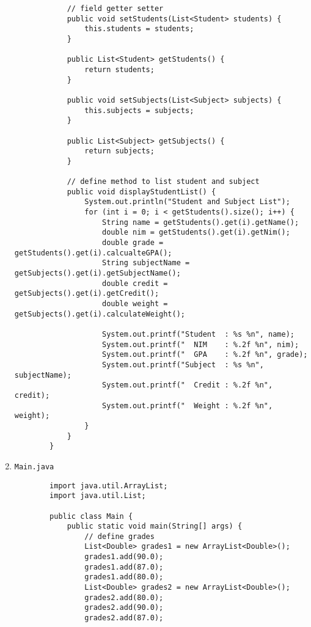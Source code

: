 \documentclass[12pt,titlepage]{article}
\begin{document}
\begin{enumerate}
\begin{verbatim}
            // field getter setter
            public void setStudents(List<Student> students) {
                this.students = students;
            }

            public List<Student> getStudents() {
                return students;
            }

            public void setSubjects(List<Subject> subjects) {
                this.subjects = subjects;
            }

            public List<Subject> getSubjects() {
                return subjects;
            }

            // define method to list student and subject
            public void displayStudentList() {
                System.out.println("Student and Subject List");
                for (int i = 0; i < getStudents().size(); i++) {
                    String name = getStudents().get(i).getName();
                    double nim = getStudents().get(i).getNim();
                    double grade = getStudents().get(i).calcualteGPA();
                    String subjectName = getSubjects().get(i).getSubjectName();
                    double credit = getSubjects().get(i).getCredit();
                    double weight = getSubjects().get(i).calculateWeight();

                    System.out.printf("Student  : %s %n", name);
                    System.out.printf("  NIM    : %.2f %n", nim);
                    System.out.printf("  GPA    : %.2f %n", grade);
                    System.out.printf("Subject  : %s %n", subjectName);
                    System.out.printf("  Credit : %.2f %n", credit);
                    System.out.printf("  Weight : %.2f %n", weight);
                }
            }
        }
    \end{verbatim}
    \item \texttt{Main.java}
    \begin{verbatim}
        import java.util.ArrayList;
        import java.util.List;

        public class Main {
            public static void main(String[] args) {
                // define grades
                List<Double> grades1 = new ArrayList<Double>();
                grades1.add(90.0);
                grades1.add(87.0);
                grades1.add(80.0);
                List<Double> grades2 = new ArrayList<Double>();
                grades2.add(80.0);
                grades2.add(90.0);
                grades2.add(87.0);


\end{verbatim}
\end{enumerate}
\end{document}
